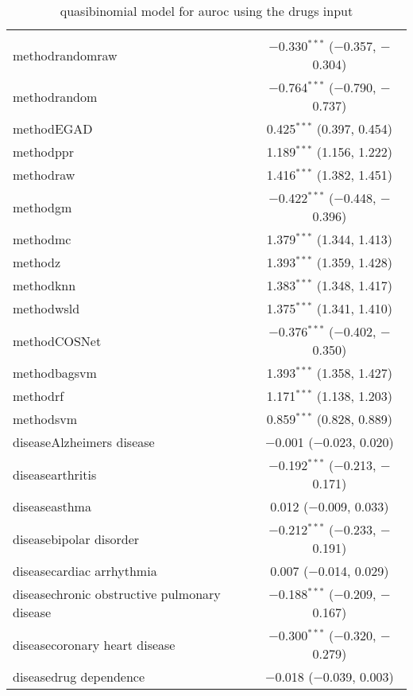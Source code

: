 
\begin{table}[!htbp] \centering 
  \caption{quasibinomial model for auroc using the drugs input} 
  \label{} 
\begin{tabular}{@{\extracolsep{5pt}}lc} 
\\[-1.8ex]\hline 
\hline \\[-1.8ex] 
 methodrandomraw & $-$0.330$^{***}$ ($-$0.357, $-$0.304) \\ 
  methodrandom & $-$0.764$^{***}$ ($-$0.790, $-$0.737) \\ 
  methodEGAD & 0.425$^{***}$ (0.397, 0.454) \\ 
  methodppr & 1.189$^{***}$ (1.156, 1.222) \\ 
  methodraw & 1.416$^{***}$ (1.382, 1.451) \\ 
  methodgm & $-$0.422$^{***}$ ($-$0.448, $-$0.396) \\ 
  methodmc & 1.379$^{***}$ (1.344, 1.413) \\ 
  methodz & 1.393$^{***}$ (1.359, 1.428) \\ 
  methodknn & 1.383$^{***}$ (1.348, 1.417) \\ 
  methodwsld & 1.375$^{***}$ (1.341, 1.410) \\ 
  methodCOSNet & $-$0.376$^{***}$ ($-$0.402, $-$0.350) \\ 
  methodbagsvm & 1.393$^{***}$ (1.358, 1.427) \\ 
  methodrf & 1.171$^{***}$ (1.138, 1.203) \\ 
  methodsvm & 0.859$^{***}$ (0.828, 0.889) \\ 
  diseaseAlzheimers disease & $-$0.001 ($-$0.023, 0.020) \\ 
  diseasearthritis & $-$0.192$^{***}$ ($-$0.213, $-$0.171) \\ 
  diseaseasthma & 0.012 ($-$0.009, 0.033) \\ 
  diseasebipolar disorder & $-$0.212$^{***}$ ($-$0.233, $-$0.191) \\ 
  diseasecardiac arrhythmia & 0.007 ($-$0.014, 0.029) \\ 
  diseasechronic obstructive pulmonary disease & $-$0.188$^{***}$ ($-$0.209, $-$0.167) \\ 
  diseasecoronary heart disease & $-$0.300$^{***}$ ($-$0.320, $-$0.279) \\ 
  diseasedrug dependence & $-$0.018 ($-$0.039, 0.003) \\ 

\end{tabular}
\end{table}
